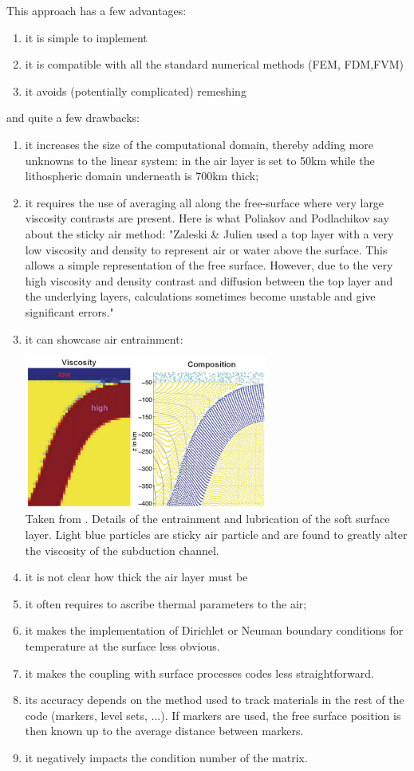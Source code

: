 This approach has a few advantages:
\begin{enumerate}
\item it is simple to implement 
\item it is compatible with all the standard numerical methods (FEM, FDM,FVM)
\item it avoids (potentially complicated) remeshing
\end{enumerate}
and quite a few drawbacks:
\begin{enumerate}
\item it increases the size of the computational domain, thereby adding more unknowns to the linear system: in \cite{scbe08} the air layer is set to 50km while the lithospheric domain underneath is 700km thick;
\item it requires the use of averaging all along the free-surface
where very large viscosity contrasts are present. Here is what Poliakov and Podlachikov \cite{popo92}
say about the sticky air method:
"Zaleski \& Julien \cite{zaju92} used a top layer with a very low
viscosity and density to represent air or water above the
surface. This allows a simple representation of the free
surface. However, due to the very high viscosity and density
contrast and diffusion between the top layer and the
underlying layers, calculations sometimes become unstable
and give significant errors."

\item it can showcase air entrainment:
\begin{center}
\includegraphics[width=8cm]{images/freesurface/scbe08}\\
{\small Taken from \cite{scbe08}. Details of the entrainment and lubrication of the soft surface layer. 
Light blue particles are sticky air particle and are found to greatly alter the viscosity
of the subduction channel.}
\end{center}
\item it is not clear how thick the air layer must be
\item it often requires to ascribe thermal parameters to the air;
\item it makes the implementation of Dirichlet or Neuman boundary conditions for temperature at the surface less
obvious.
\item it makes the coupling with surface processes codes less straightforward.
\item its accuracy depends on the method used to track materials in the rest of the code (markers, level sets, ...). If markers are used, the free surface position is then known up to the average distance between markers.
\item it negatively impacts the condition number of the matrix.
\end{enumerate}

